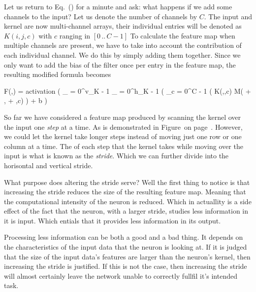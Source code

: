 \startsubsubsection[title=Multiple channels]
Let us return to Eq.~() for a minute and ask: what happens if we add some channels to the input?
Let us denote the number of channels by $C$.
The input and kernel are now multi-channel arrays, their individual entries will be denoted as $K(i,j,c)$ with $c$ ranging in $[0 \, .. \, C - 1]$
To calculate the feature map when multiple channels are present, we have to take into account the contribution of each individual channel.
We do this by simply adding them together.
Since we only want to add the bias of the filter once per entry in the feature map, the resulting modified formula becomes

\startplaceformula[reference=devel-feature-4]
\startformula
F(\color[red]{i},\color[red]{j}) = {\rm activation} \left( \sum_{\color[blue]{i} = 0}^{v_K - 1} \sum_{\color[blue]{j} = 0}^{h_K - 1} \left( \sum_{c = 0}^{C - 1} \Bigl( K(\color[blue]{i},\color[blue]{j},c) \cdot M(\color[red]{i} + \color[blue]{i}, \color[red]{j} + \color[blue]{j},c) \right) + b \right)
\stopformula
\stopplaceformula
\stopsubsubsection

\startsubsubsection[title=The stride]
So far we have considered a feature map produced by scanning the kernel over the input one {\em step} at a time.
As is demonstrated in Figure~ on page~.
However, we could let the kernel take longer steps instead of moving just one row or one column at a time.
The  of each step that the kernel takes while moving over the input is what is known as the {\em stride}.
Which we can further divide into the horisontal and vertical stride.

What purpose does altering the stride serve?
Well the first thing to notice is that increasing the stride reduces the size of the resulting feature map.
Meaning that the computational intensity of the neuron is reduced.
Which in actuallity is a side effect of the fact that the neuron, with a larger stride, studies less information in it is input.
Which entials that it provides less information in its output.

Processing less information can be both a good and a bad thing.
It depends on the characteristics of the input data that the neuron is looking at.
If it is judged that the size of the input data's features are larger than the neuron's kernel, then increasing the stride is justified.
If this is not the case, then increasing the stride will almost certainly leave the network unable to correctly fullfil it's intended task.

